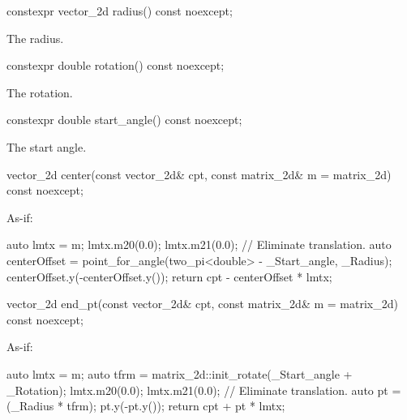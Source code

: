 %
\begin{itemdecl}
constexpr vector_2d radius() const noexcept;
\end{itemdecl}
\begin{itemdescr}
\pnum
\returns
The radius.
\end{itemdescr}

%
\begin{itemdecl}
constexpr double rotation() const noexcept;
\end{itemdecl}
\begin{itemdescr}
\pnum
\returns
The rotation.
\end{itemdescr}

%
\begin{itemdecl}
constexpr double start_angle() const noexcept;
\end{itemdecl}
\begin{itemdescr}
\pnum
\returns
The start angle.
\end{itemdescr}

%
\begin{itemdecl}
vector_2d center(const vector_2d& cpt, const matrix_2d& m = matrix_2d{})
  const noexcept;
\end{itemdecl}
\begin{itemdescr}
\pnum
\returns
As-if:
\begin{codeblock}
auto lmtx = m;
lmtx.m20(0.0); lmtx.m21(0.0); // Eliminate translation.
auto centerOffset = point_for_angle(two_pi<double> - _Start_angle, _Radius);
centerOffset.y(-centerOffset.y());
return cpt - centerOffset * lmtx;
\end{codeblock}
\end{itemdescr}

%
\begin{itemdecl}
vector_2d end_pt(const vector_2d& cpt, const matrix_2d& m = matrix_2d{})
  const noexcept;
\end{itemdecl}
\begin{itemdescr}
\pnum
\returns
As-if:
\begin{codeblock}
auto lmtx = m;
auto tfrm = matrix_2d::init_rotate(_Start_angle + _Rotation);
lmtx.m20(0.0); lmtx.m21(0.0); // Eliminate translation.
auto pt = (_Radius * tfrm);
pt.y(-pt.y());
return cpt + pt * lmtx;
\end{codeblock}
\end{itemdescr}

